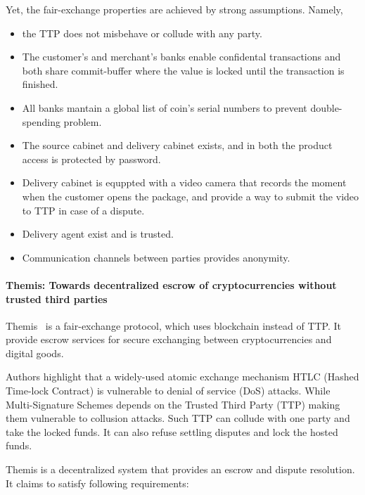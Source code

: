\documentclass{ieeeaccess}
\begin{document}
Yet, the fair-exchange properties are achieved by strong assumptions.
Namely,

\begin{itemize}
    \item the TTP does not misbehave or collude with any party. 
    \item The customer's and merchant's banks enable confidental transactions and both share commit-buffer where the value is locked until the transaction is finished.   
    \item All banks mantain a global list of coin's serial numbers to prevent double-spending problem. 
    \item The source cabinet and delivery cabinet exists, and in both the product access is protected by password.
    \item Delivery cabinet is equppted with a video camera that records the moment when the customer opens the package, and provide a way to submit the video to TTP in case of a dispute. 
    \item Delivery agent exist and is trusted. 
    \item Communication channels between parties provides anonymity.
\end{itemize}

\paragraph{Themis: Towards decentralized escrow of cryptocurrencies
without trusted third
parties}\label{themis-towards-decentralized-escrow-of-cryptocurrencies-without-trusted-third-parties}

Themis~\cite{meng2019themis} is a fair-exchange
protocol, which uses blockchain instead of TTP. It provide escrow
services for secure exchanging between cryptocurrencies and digital
goods.

Authors highlight that a widely-used atomic exchange mechanism HTLC
(Hashed Time-lock Contract) is vulnerable to denial of service (DoS)
attacks. While Multi-Signature Schemes depends on the Trusted Third
Party (TTP) making them vulnerable to collusion attacks. Such TTP can
collude with one party and take the locked funds. It can also refuse
settling disputes and lock the hosted funds.

Themis is a decentralized system that provides an escrow and dispute
resolution. It claims to satisfy following requirements:
\end{document}
